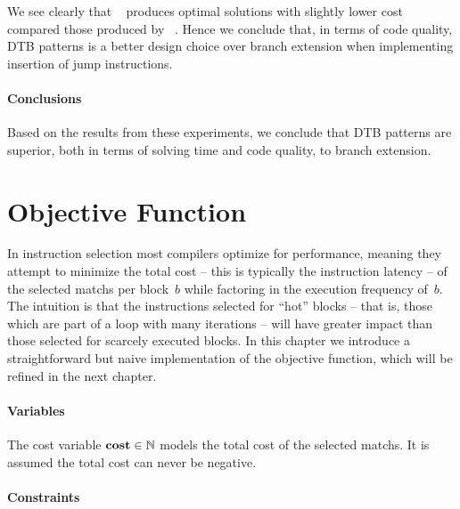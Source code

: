 We see clearly that ~ produces
optimal \glspl{solution} with slightly lower cost compared those produced by
~.
%
Hence we conclude that, in terms of code quality,
\glspl{DTB pattern} is a better design choice over \gls{branch extension} when
implementing insertion of jump \glspl{instruction}.


\paragraph{Conclusions}

Based on the results from these experiments, we conclude that \glspl{DTB
  pattern} are superior, both in terms of solving time and code quality, to
\gls{branch extension}.


\section{Objective Function}

In \gls{instruction selection} most \glspl{compiler} optimize for performance,
meaning they attempt to minimize the total cost -- this is typically the
\gls{instruction} latency -- of the selected \glspl{match} per \gls{block}~$b$
while factoring in the execution frequency of~$b$.
%
The intuition is that the \glspl{instruction} selected for ``hot'' \glspl{block}
-- that is, those which are part of a loop with many iterations -- will have
greater impact than those selected for scarcely executed \glspl{block}.
%
In this chapter we introduce a straightforward but naive implementation of the
\gls{objective function}, which will be refined in the next chapter.


\paragraph{Variables}

The \gls{cost variable} \mbox{$\mVar{cost} \in \mathbb{N}$} models the total
cost of the selected \glspl{match}.
%
It is assumed the total cost can never be negative.


\paragraph{Constraints}

